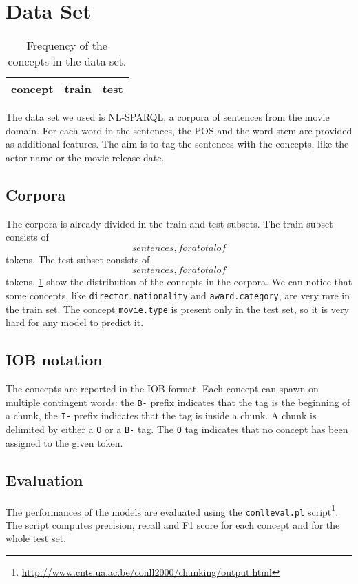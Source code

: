 \section{Data Set}
\label{sec:dataset}

\begin{table}[t!]
	\centering
    \begin{tabular}{ l l l }
    	\toprule
    		\multicolumn{1}{l}{concept} & \multicolumn{1}{l}{train} & \multicolumn{1}{c}{test} \\
    	\midrule
            
    	\bottomrule
	\end{tabular}
    \caption{Frequency of the concepts in the data set.}
	\label{tab:frequencies}
\end{table}

The data set we used is NL-SPARQL, a corpora of sentences from the movie domain.
For each word in the sentences, the \ac{POS} and the word stem are provided as additional features.
The aim is to tag the sentences with the concepts, like the actor name or the movie release date.

\subsection{Corpora}
The corpora is already divided in the train and test subsets.
The train subset consists of $$ sentences,
for a total of $$ tokens.
The test subset consists of $$ sentences,
for a total of $$ tokens.
\cref{tab:frequencies} show the distribution of the concepts in the corpora.
We can notice that some concepts, like \texttt{director.nationality} and \texttt{award.category},
are very rare in the train set.
The concept \texttt{movie.type} is present only in the test set, so it is very hard for any model to predict it.

\subsection{IOB notation}
The concepts are reported in the \ac{IOB} format.
Each concept can spawn on multiple contingent words:
the \texttt{B-} prefix indicates that the tag is the beginning of a chunk,
the \texttt{I-} prefix indicates that the tag is inside a chunk.
A chunk is delimited by either a \texttt{O} or a \texttt{B-} tag.
The \texttt{O} tag indicates that no concept has been assigned to the given token.

\subsection{Evaluation}
The performances of the models are evaluated using the \texttt{conlleval.pl}
script\footnote{\url{http://www.cnts.ua.ac.be/conll2000/chunking/output.html}}.
The script computes precision, recall and F1 score for each concept and for the whole test set.
